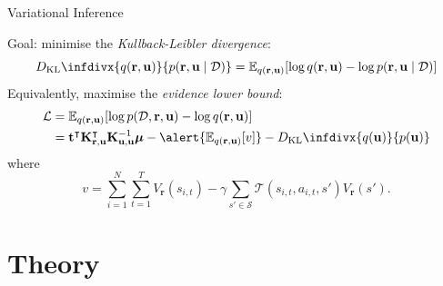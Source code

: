 \documentclass{beamer}
\newcommand{\Kuu}{\mathbf{K}_{\mathbf{u},\mathbf{u}}}
\newcommand{\Kru}{\mathbf{K}_{\mathbf{r},\mathbf{u}}}
\newcommand{\V}{V_{\mathbf{r}}}
\newcommand{\DKL}{D_{\mathrm{KL}}\infdivx}
\begin{document}
\begin{frame}{Variational Inference}
  \begin{figure}
    \centering
  \end{figure}
  Goal: \alert{minimise} the \emph{Kullback-Leibler divergence}:
  \[
    \DKL{q(\mathbf{r}, \mathbf{u})}{p(\mathbf{r}, \mathbf{u} \mid \mathcal{D})}
    = \mathbb{E}_{q(\mathbf{r}, \mathbf{u})}[\log q(\mathbf{r}, \mathbf{u}) -
    \log p(\mathbf{r}, \mathbf{u} \mid \mathcal{D})]
  \]
  Equivalently, \alert{maximise} the \emph{evidence lower bound}:
  \begin{align*}
    \mathcal{L} &= \mathbb{E}_{q(\mathbf{r}, \mathbf{u})}[\log p(\mathcal{D}, \mathbf{r}, \mathbf{u}) - \log q(\mathbf{r}, \mathbf{u})] \\
                &= \mathbf{t}^\intercal\Kru^\intercal\Kuu^{-1}\bm\mu - \alert{\mathbb{E}_{q(\mathbf{r}, \mathbf{u})}[v]} - \DKL{q(\mathbf{u})}{p(\mathbf{u})}
  \end{align*}
  where
  \[
    v = \sum_{i=1}^N \sum_{t=1}^T \V(s_{i,t}) - \gamma\sum_{s' \in \mathcal{S}}
    \mathcal{T}(s_{i,t}, a_{i,t}, s')\V(s').
  \]
\end{frame}

\section{Theory}
\end{document}
